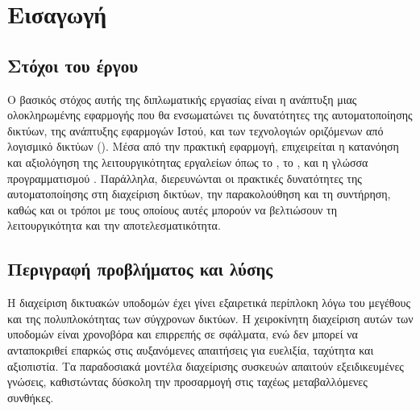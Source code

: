 \chapter{Εισαγωγή}

\section{Στόχοι του έργου}

Ο βασικός στόχος αυτής της διπλωματικής εργασίας είναι η 
ανάπτυξη μιας ολοκληρωμένης εφαρμογής που θα ενσωματώνει τις δυνατότητες της αυτοματοποίησης δικτύων, της 
ανάπτυξης εφαρμογών Ιστού, και των τεχνολογιών οριζόμενων από λογισμικό δικτύων (). 
Μέσα από την πρακτική εφαρμογή, επιχειρείται η κατανόηση και αξιολόγηση της λειτουργικότητας εργαλείων όπως το 
, το , και η γλώσσα προγραμματισμού . Παράλληλα, διερευνώνται οι πρακτικές δυνατότητες της αυτοματοποίησης 
στη διαχείριση δικτύων, την παρακολούθηση και τη συντήρηση, καθώς και οι τρόποι με τους οποίους αυτές μπορούν να βελτιώσουν τη λειτουργικότητα 
και την αποτελεσματικότητα.

\section{Περιγραφή προβλήματος και λύσης}
Η διαχείριση δικτυακών υποδομών έχει γίνει εξαιρετικά περίπλοκη λόγω του μεγέθους και της πολυπλοκότητας των σύγχρονων δικτύων. 
Η χειροκίνητη διαχείριση αυτών των υποδομών είναι χρονοβόρα και επιρρεπής σε σφάλματα, ενώ δεν μπορεί να ανταποκριθεί επαρκώς στις 
αυξανόμενες απαιτήσεις για ευελιξία, ταχύτητα και αξιοπιστία. Τα παραδοσιακά μοντέλα διαχείρισης συσκευών απαιτούν εξειδικευμένες γνώσεις, 
καθιστώντας δύσκολη την προσαρμογή στις ταχέως μεταβαλλόμενες συνθήκες.


